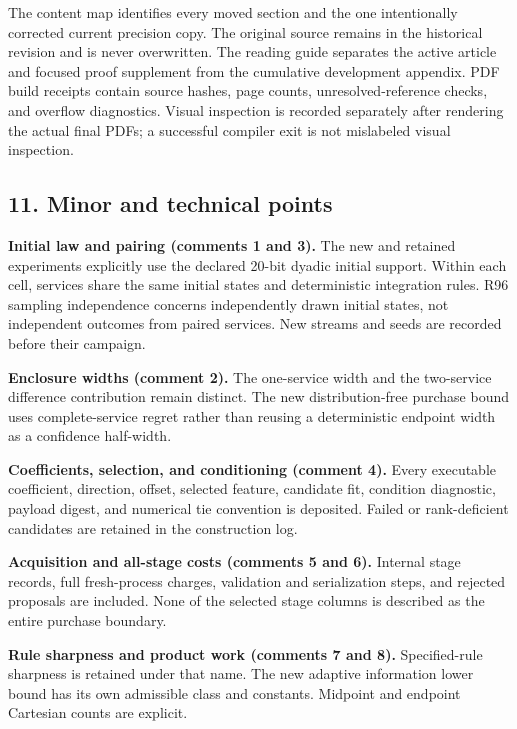 The content map identifies every moved section and the one intentionally
corrected current precision copy. The original source remains in the
historical revision and is never overwritten. The reading guide
separates the active article and focused proof supplement from the
cumulative development appendix. PDF build receipts contain source
hashes, page counts, unresolved-reference checks, and overflow
diagnostics. Visual inspection is recorded separately after rendering
the actual final PDFs; a successful compiler exit is not mislabeled
visual inspection.

\hypertarget{minor-and-technical-points}{%
\subsection{11. Minor and technical
points}\label{minor-and-technical-points}}

\textbf{Initial law and pairing (comments 1 and 3).} The new and
retained experiments explicitly use the declared 20-bit dyadic initial
support. Within each cell, services share the same initial states and
deterministic integration rules. R96 sampling independence concerns
independently drawn initial states, not independent outcomes from paired
services. New streams and seeds are recorded before their campaign.

\textbf{Enclosure widths (comment 2).} The one-service width and the
two-service difference contribution remain distinct. The new
distribution-free purchase bound uses complete-service regret rather
than reusing a deterministic endpoint width as a confidence half-width.

\textbf{Coefficients, selection, and conditioning (comment 4).} Every
executable coefficient, direction, offset, selected feature, candidate
fit, condition diagnostic, payload digest, and numerical tie convention
is deposited. Failed or rank-deficient candidates are retained in the
construction log.

\textbf{Acquisition and all-stage costs (comments 5 and 6).} Internal
stage records, full fresh-process charges, validation and serialization
steps, and rejected proposals are included. None of the selected stage
columns is described as the entire purchase boundary.

\textbf{Rule sharpness and product work (comments 7 and 8).}
Specified-rule sharpness is retained under that name. The new adaptive
information lower bound has its own admissible class and constants.
Midpoint and endpoint Cartesian counts are explicit.

